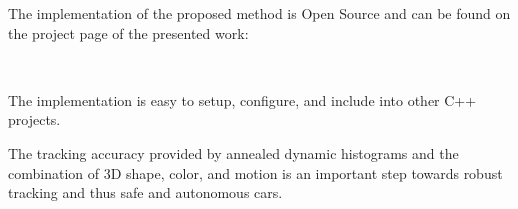 \documentclass[twoside,a4paper,article]{combine}
\begin{document}
The implementation of the proposed method is Open Source and can be
found on the project page of the presented work:

{\\}

The implementation is easy to setup, configure, and include into other
C++ projects.

The tracking accuracy provided by annealed dynamic histograms and the
combination of 3D shape, color, and motion is an important step
towards robust tracking and thus safe and autonomous cars.





\end{document}
